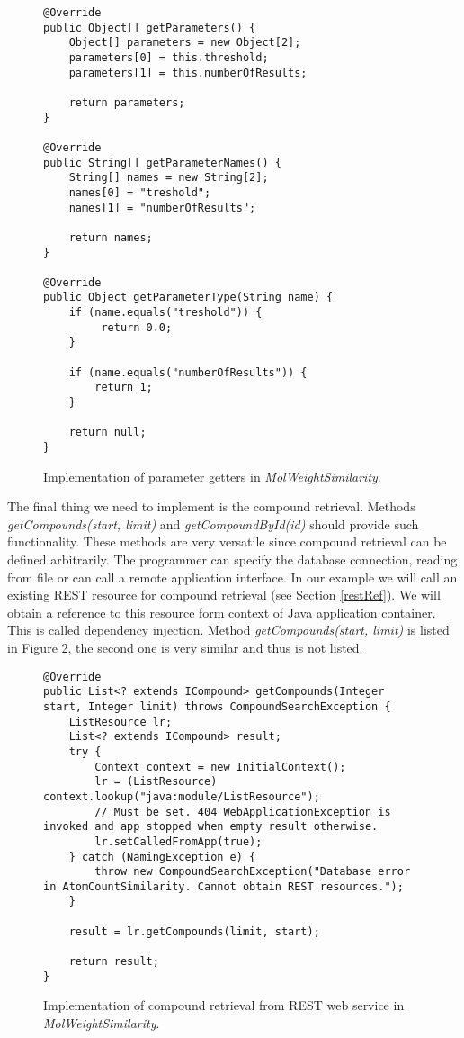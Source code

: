 \documentclass[thesis=M,english]{FITthesis}[2012/10/20]
\begin{document}
\begin{figure}
\begin{lstlisting}
@Override
public Object[] getParameters() {
    Object[] parameters = new Object[2];
    parameters[0] = this.threshold;
    parameters[1] = this.numberOfResults;

    return parameters;
}

@Override
public String[] getParameterNames() {
    String[] names = new String[2];
    names[0] = "treshold";
    names[1] = "numberOfResults";

    return names;
}

@Override
public Object getParameterType(String name) {
    if (name.equals("treshold")) {
         return 0.0;
    }

    if (name.equals("numberOfResults")) {
        return 1;
    }

    return null;
}
\end{lstlisting}
\caption{Implementation of parameter getters in \textit{MolWeightSimilarity}.}
\label{MolWeightSimilarity4}
\end{figure}

The final thing we need to implement is the compound retrieval. Methods \textit{getCompounds(start, limit)} and \textit{getCompoundById(id)} should provide such functionality. These methods are very versatile since compound retrieval can be defined arbitrarily. The programmer can specify the database connection, reading from file or can call a remote application interface. In our example we will call an existing REST resource for compound retrieval (see Section \ref{restRef}). We will obtain a reference to this resource form context of Java application container. This is called dependency injection. Method \textit{getCompounds(start, limit)} is listed in Figure \ref{MolWeightSimilarity5}, the second one is very similar and thus is not listed.

\begin{figure}
\begin{lstlisting}
@Override
public List<? extends ICompound> getCompounds(Integer start, Integer limit) throws CompoundSearchException {
    ListResource lr;
    List<? extends ICompound> result;
    try {
        Context context = new InitialContext();
        lr = (ListResource) context.lookup("java:module/ListResource");
        // Must be set. 404 WebApplicationException is invoked and app stopped when empty result otherwise.
        lr.setCalledFromApp(true);
    } catch (NamingException e) {
        throw new CompoundSearchException("Database error in AtomCountSimilarity. Cannot obtain REST resources.");
    }

    result = lr.getCompounds(limit, start);

    return result;
}
\end{lstlisting}
\caption{Implementation of compound retrieval from REST web service in \textit{MolWeightSimilarity}.}
\label{MolWeightSimilarity5}
\end{figure}
\end{document}
